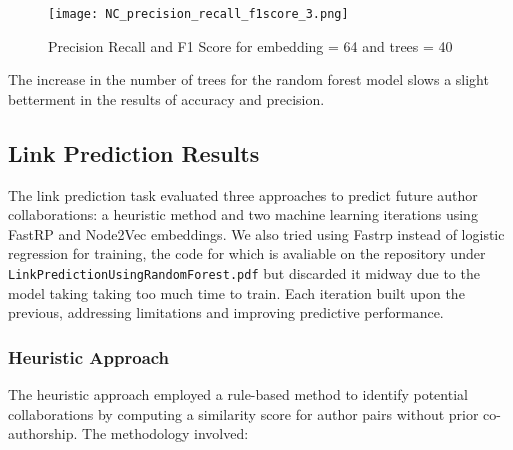 \documentclass[conference, 12pt]{IEEEtran}
\begin{document}
\begin{figure}[h]
    \centering
    \texttt{[image: NC\_precision\_recall\_f1score\_3.png]} 
    \caption{Precision Recall and F1 Score for embedding = 64 and trees = 40}
    \label{fig:NC_Precision_Recall_3}
\end{figure}

The increase in the number of trees for the random forest model slows a slight betterment in the results of 
accuracy and precision.


\subsection{Link Prediction Results}
The link prediction task evaluated three approaches to predict future author collaborations: a heuristic method and two machine learning iterations using FastRP and Node2Vec embeddings. We also tried using Fastrp instead of logistic regression for training, the code for which is avaliable on the repository under \texttt{LinkPredictionUsingRandomForest.pdf}  but discarded it midway due to the model taking taking too much time to train. Each iteration built upon the previous, addressing limitations and improving predictive performance.

\subsubsection{Heuristic Approach}
The heuristic approach employed a rule-based method to identify potential collaborations by computing a similarity score for author pairs without prior co-authorship. The methodology involved:
\end{document}
